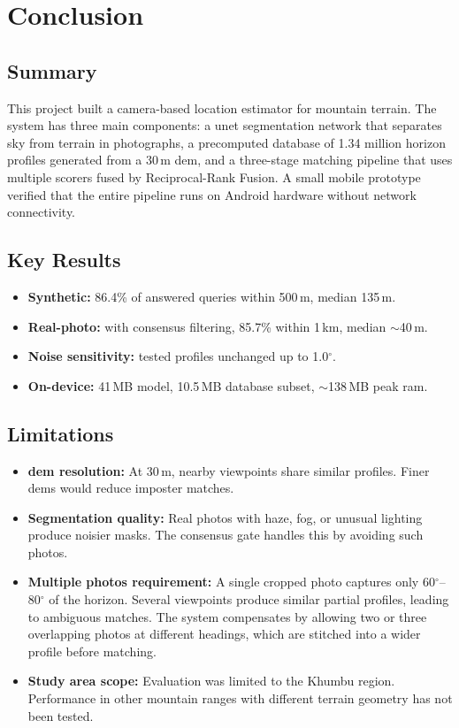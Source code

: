 \chapter{Conclusion}
\label{chap:conclusion}

\section{Summary}

This project built a camera-based location estimator for mountain terrain. The system has three main components: a \Gls{unet} segmentation network that separates sky from terrain in photographs, a precomputed database of 1.34 million horizon profiles generated from a 30\,m \Gls{dem}, and a three-stage matching pipeline that uses multiple scorers fused by Reciprocal-Rank Fusion. A small mobile prototype verified that the entire pipeline runs on Android hardware without network connectivity.

\section{Key Results}

\begin{itemize}
    \item \textbf{Synthetic:} 86.4\% of answered queries within 500\,m, median 135\,m.
    \item \textbf{Real-photo:} with consensus filtering, 85.7\% within 1\,km, median $\sim$40\,m.
    \item \textbf{Noise sensitivity:} tested profiles unchanged up to 1.0$^\circ$.
    \item \textbf{On-device:} 41\,MB model, 10.5\,MB database subset, $\sim$138\,MB peak \Gls{ram}.
\end{itemize}

\section{Limitations}

\begin{itemize}
    \item \textbf{\Gls{dem} resolution:} At 30\,m, nearby viewpoints share similar profiles. Finer \Gls{dem}s would reduce imposter matches.
    \item \textbf{Segmentation quality:} Real photos with haze, fog, or unusual lighting produce noisier masks. The consensus gate handles this by avoiding such photos.
    \item \textbf{Multiple photos requirement:} A single cropped photo captures only 60$^\circ$--80$^\circ$ of the horizon. Several viewpoints produce similar partial profiles, leading to ambiguous matches. The system compensates by allowing two or three overlapping photos at different headings, which are stitched into a wider profile before matching.
    \item \textbf{Study area scope:} Evaluation was limited to the Khumbu region. Performance in other mountain ranges with different terrain geometry has not been tested.
\end{itemize}

